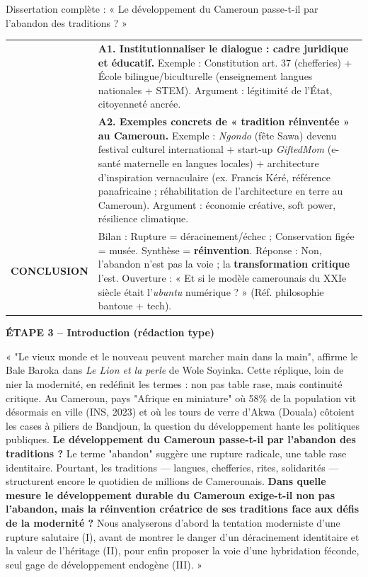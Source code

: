 \documentclass[11pt]{article}
\begin{document}
\begin{exoresolu}{Dissertation complète : « Le développement du Cameroun passe-t-il par l'abandon des traditions ? »}
\begin{center}
\begin{tabularx}{\linewidth}{|l|X|}
& \textbf{A1. Institutionnaliser le dialogue : cadre juridique et éducatif.} Exemple : Constitution art. 37 (chefferies) + École bilingue/biculturelle (enseignement langues nationales + STEM). Argument : légitimité de l'État, citoyenneté ancrée. \\
& \textbf{A2. Exemples concrets de « tradition réinventée » au Cameroun.} Exemple : \emph{Ngondo} (fête Sawa) devenu festival culturel international + start-up \emph{GiftedMom} (e-santé maternelle en langues locales) + architecture d'inspiration vernaculaire (ex. Francis Kéré, référence panafricaine ; réhabilitation de l'architecture en terre au Cameroun). Argument : économie créative, soft power, résilience climatique. \\ \hline
\textbf{CONCLUSION} & Bilan : Rupture = déracinement/échec ; Conservation figée = musée. Synthèse = \textbf{réinvention}. Réponse : Non, l'abandon n'est pas la voie ; la \textbf{transformation critique} l'est. Ouverture : « Et si le modèle camerounais du XXIe siècle était l'\emph{ubuntu} numérique ? » (Réf. philosophie bantoue + tech). \\ \hline
\end{tabularx}
\end{center}

\textbf{ÉTAPE 3 -- Introduction (rédaction type)}

« "Le vieux monde et le nouveau peuvent marcher main dans la main", affirme le Bale Baroka dans \emph{Le Lion et la perle} de Wole Soyinka. Cette réplique, loin de nier la modernité, en redéfinit les termes : non pas table rase, mais continuité critique. Au Cameroun, pays "Afrique en miniature" où 58\% de la population vit désormais en ville (INS, 2023) et où les tours de verre d'Akwa (Douala) côtoient les cases à piliers de Bandjoun, la question du développement hante les politiques publiques. \textbf{Le développement du Cameroun passe-t-il par l'abandon des traditions ?} Le terme "abandon" suggère une rupture radicale, une table rase identitaire. Pourtant, les traditions — langues, chefferies, rites, solidarités — structurent encore le quotidien de millions de Camerounais. \textbf{Dans quelle mesure le développement durable du Cameroun exige-t-il non pas l'abandon, mais la réinvention créatrice de ses traditions face aux défis de la modernité ?} Nous analyserons d'abord la tentation moderniste d'une rupture salutaire (I), avant de montrer le danger d'un déracinement identitaire et la valeur de l'héritage (II), pour enfin proposer la voie d'une hybridation féconde, seul gage de développement endogène (III). »


\end{exoresolu}
\end{document}
